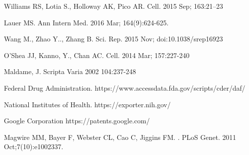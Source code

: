 \documentclass[10pt,letterpaper]{article}
\begin{document}
\nolinenumbers

%
%
% 
\begin{thebibliography}{10}

Williams RS, Lotia S., Holloway AK, Pico AR.
\newblock Cell. 2015 Sep; 163:21--23

Lauer MS.
\newblock Ann Intern Med. 2016 Mar; 164(9):624-625.

Wang M., Zhao Y.., Zhang B.
\newblock Sci. Rep. 2015 Nov; doi:10.1038/srep16923

O'Shea JJ, Kanno, Y., Chan AC.
\newblock Cell. 2014 Mar; 157:227-240

Maldame, J.
\newblock Scripta Varia 2002 104:237-248

Federal Drug Administration.
\newblock https://www.accessdata.fda.gov/scripts/cder/daf/

National Institutes of Health.
\newblock https://exporter.nih.gov/

Google Corporation
\newblock https://patents.google.com/

Magwire MM, Bayer F, Webster CL, Cao C, Jiggins FM.
.
\newblock PLoS Genet. 2011 Oct;7(10):e1002337.

\end{thebibliography}
\end{document}
